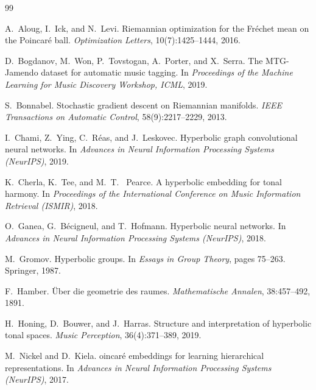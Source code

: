 \documentclass[12pt,a4paper]{article}
\begin{document}
\begin{thebibliography}{99}

A.~Aloug, I.~Ick, and N.~Levi.
\newblock Riemannian optimization for the {F}r\'{e}chet mean on the {P}oincar\'{e} ball.
\newblock \emph{Optimization Letters}, 10(7):1425--1444, 2016.

D.~Bogdanov, M.~Won, P.~Tovstogan, A.~Porter, and X.~Serra.
\newblock The {MTG-Jamendo} dataset for automatic music tagging.
\newblock In \emph{Proceedings of the Machine Learning for Music Discovery Workshop, ICML}, 2019.

S.~Bonnabel.
\newblock Stochastic gradient descent on {R}iemannian manifolds.
\newblock \emph{IEEE Transactions on Automatic Control}, 58(9):2217--2229, 2013.

I.~Chami, Z.~Ying, C.~R\'{e}as, and J.~Leskovec.
\newblock Hyperbolic graph convolutional neural networks.
\newblock In \emph{Advances in Neural Information Processing Systems (NeurIPS)}, 2019.

K.~Cherla, K.~Tee, and M.~T.~ Pearce.
\newblock A hyperbolic embedding for tonal harmony.
\newblock In \emph{Proceedings of the International Conference on Music Information Retrieval (ISMIR)}, 2018.

O.~Ganea, G.~B\'{e}cigneul, and T.~Hofmann.
\newblock Hyperbolic neural networks.
\newblock In \emph{Advances in Neural Information Processing Systems (NeurIPS)}, 2018.

M.~Gromov.
\newblock Hyperbolic groups.
\newblock In \emph{Essays in Group Theory}, pages 75--263. Springer, 1987.

F.~Hamber.
\newblock \"{U}ber die geometrie des raumes.
\newblock \emph{Mathematische Annalen}, 38:457--492, 1891.

H.~Honing, D.~Bouwer, and J.~Harras.
\newblock Structure and interpretation of hyperbolic tonal spaces.
\newblock \emph{Music Perception}, 36(4):371--389, 2019.

M.~Nickel and D.~Kiela.
oincar\'{e} embeddings for learning hierarchical representations.
\newblock In \emph{Advances in Neural Information Processing Systems (NeurIPS)}, 2017.


\end{thebibliography}
\end{document}
